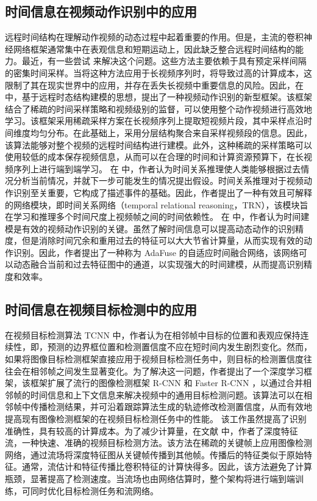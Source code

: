 \subsection{时间信息在视频动作识别中的应用}
远程时间结构在理解动作视频的动态过程中起着重要的作用。但是，主流的卷积神经网络框架通常集中在表观信息和短期运动上，因此缺乏整合远程时间结构的能力。最近，有一些尝试 \cite{Motionlets} 来解决这个问题。这些方法主要依赖于具有预定采样间隔的密集时间采样。当将这种方法应用于长视频序列时，将导致过高的计算成本，这限制了其在现实世界中的应用，并存在丢失长视频中重要信息的风险。因此，在 \cite{TSN} 中，基于远程时态结构建模的思想，提出了一种视频动作识别的新型框架。该框架结合了稀疏的时间采样策略和视频级别的监督，可以使用整个动作视频进行高效地学习。该框架采用稀疏采样方案在长视频序列上提取短视频片段，其中采样点沿时间维度均匀分布。在此基础上，采用分层结构聚合来自采样视频段的信息。因此，该算法能够对整个视频的远程时间结构进行建模。此外，这种稀疏的采样策略可以使用较低的成本保存视频信息，从而可以在合理的时间和计算资源预算下，在长视频序列上进行端到端学习。%
在 \cite{TRN} 中，作者认为时间关系推理使人类能够根据过去情况分析当前情况，并就下一步可能发生的情况提出假设。时间关系推理对于视频动作识别至关重要，它构成了描述事件的基础。因此，作者提出了一种有效且可解释的网络模块，即时间关系网络（temporal relational reasoning，TRN），该模块旨在学习和推理多个时间尺度上视频帧之间的时间依赖性。%
在 \cite{AdaFuse} 中，作者认为时间建模是有效的视频动作识别的关键。虽然了解时间信息可以提高动态动作的识别精度，但是消除时间冗余和重用过去的特征可以大大节省计算量，从而实现有效的动作识别。因此，作者提出了一种称为 AdaFuse 的自适应时间融合网络，该网络可以动态融合当前和过去特征图中的通道，以实现强大的时间建模，从而提高识别精度和效率。%
\subsection{时间信息在视频目标检测中的应用}
在视频目标检测算法 TCNN \cite{TCNN} 中，作者认为在相邻帧中目标的位置和表观应保持连续性，即，预测的边界框位置和检测置信度不应在短时间内发生剧烈变化。然而，如果将图像目标检测框架直接应用于视频目标检测任务中，则目标的检测置信度往往会在相邻帧之间发生显著变化。为了解决这一问题，作者提出了一个深度学习框架，该框架扩展了流行的图像检测框架 R-CNN \cite{girshick2014rich} 和 Faster R-CNN \cite{ren2015faster}，以通过合并相邻帧的时间信息和上下文信息来解决视频中的通用目标检测问题。该算法可以在相邻帧中传播检测结果，并可沿着跟踪算法生成的轨迹修改检测置信度，从而有效地提高现有图像检测框架的在视频目标检测任务中的性能。%
该工作虽然提高了识别准确性，具有较高的计算成本。为了减少计算量，在文献 \cite{DeepFeature} 中，作者了深度特征流，一种快速、准确的视频目标检测方法。该方法在稀疏的关键帧上应用图像检测网络，通过流场将深度特征图从关键帧传播到其他帧。传播后的特征类似于原始特征。通常，流估计和特征传播比卷积特征的计算快得多。因此，该方法避免了计算瓶颈，显著提高了检测速度。当流场也由网络估算时，整个架构将进行端到端训练，可同时优化目标检测任务和流网络。%
